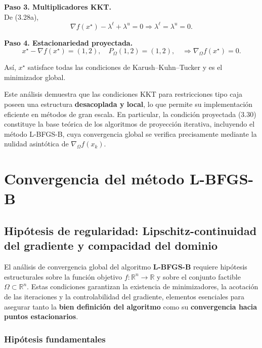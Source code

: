 \documentclass[
  spanish,
  us-letterpaper,
  DIV=11,
  numbers=noendperiod]{scrreprt}
\numberwithin{equation}{section}
\begin{document}
\textbf{Paso 3. Multiplicadores KKT.}\\
De (3.28a), \[
\nabla f(x^\star) - \lambda^\ell + \lambda^u = 0
\Rightarrow \lambda^\ell = \lambda^u = 0.
\]

\textbf{Paso 4. Estacionariedad proyectada.}\\
\[
x^\star - \nabla f(x^\star) = (1,2),\quad
P_\Omega(1,2) = (1,2),
\quad \Rightarrow \nabla_\Omega f(x^\star) = 0.
\]

Así, \(x^\star\) satisface todas las condiciones de Karush--Kuhn--Tucker
y es el minimizador global.

Este análisis demuestra que las condiciones KKT para restricciones tipo
caja poseen una estructura \textbf{desacoplada y local}, lo que permite
su implementación eficiente en métodos de gran escala. En particular, la
condición proyectada (3.30) constituye la base teórica de los algoritmos
de proyección iterativa, incluyendo el método L-BFGS-B, cuya
convergencia global se verifica precisamente mediante la nulidad
asintótica de \(\nabla_\Omega f(x_k)\).

\section{Convergencia del método
L-BFGS-B}\label{convergencia-del-muxe9todo-l-bfgs-b}

\subsection{Hipótesis de regularidad: Lipschitz-continuidad del
gradiente y compacidad del
dominio}\label{hipuxf3tesis-de-regularidad-lipschitz-continuidad-del-gradiente-y-compacidad-del-dominio}

El análisis de convergencia global del algoritmo \textbf{L-BFGS-B}
requiere hipótesis estructurales sobre la función objetivo
\(f : \mathbb{R}^n \to \mathbb{R}\) y sobre el conjunto factible
\(\Omega \subset \mathbb{R}^n\). Estas condiciones garantizan la
existencia de minimizadores, la acotación de las iteraciones y la
controlabilidad del gradiente, elementos esenciales para asegurar tanto
la \textbf{bien definición del algoritmo} como su \textbf{convergencia
hacia puntos estacionarios}.

\subsubsection{Hipótesis
fundamentales}\label{hipuxf3tesis-fundamentales}
\end{document}
